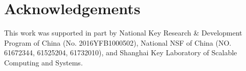 \section*{Acknowledgements}
This work was supported in part by National Key Research \& Development Program of China (No. 2016YFB1000502), National NSF of China (NO. 61672344, 61525204, 61732010), and Shanghai Key Laboratory of Scalable Computing and Systems.
